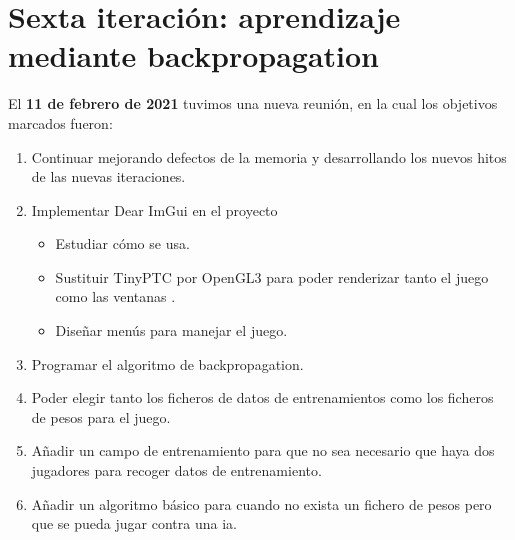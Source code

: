 \section{Sexta iteración: aprendizaje mediante backpropagation}
El \textbf{11 de febrero de 2021} tuvimos una nueva reunión, en la cual los objetivos marcados fueron:
\begin{enumerate}
	\item Continuar mejorando defectos de la memoria y desarrollando los nuevos hitos de las nuevas iteraciones.
	\item Implementar Dear ImGui en el proyecto
	\begin{itemize}
		\item Estudiar cómo se usa.
		\item Sustituir TinyPTC por OpenGL3 para poder renderizar tanto el juego como las ventanas .
		\item Diseñar menús para manejar el juego.
	\end{itemize}
	\item Programar el algoritmo de backpropagation.
	\item Poder elegir tanto los ficheros de datos de entrenamientos como los ficheros de pesos para el juego.
	\item Añadir un campo de entrenamiento para que no sea necesario que haya dos jugadores para recoger datos de entrenamiento.
	\item Añadir un algoritmo básico para cuando no exista un fichero de pesos pero que se pueda jugar contra una \gls{ia}.
\end{enumerate}

